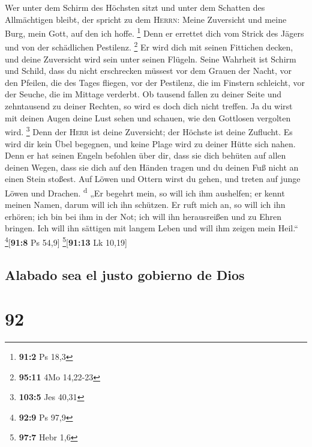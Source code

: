  Wer unter dem Schirm des Höchsten sitzt und unter dem
Schatten des Allmächtigen bleibt,  der spricht zu dem
\textsc{Herrn}: Meine Zuversicht und meine Burg, mein Gott, auf den ich
hoffe. \footnote{\textbf{91:2} Ps 18,3}  Denn er errettet
dich vom Strick des Jägers und von der schädlichen Pestilenz.
\footnote{\textbf{95:11} 4Mo 14,22-23}  Er wird dich mit
seinen Fittichen decken, und deine Zuversicht wird sein unter seinen
Flügeln. Seine Wahrheit ist Schirm und Schild,  dass du
nicht erschrecken müssest vor dem Grauen der Nacht, vor den Pfeilen, die
des Tages fliegen,  vor der Pestilenz, die im Finstern
schleicht, vor der Seuche, die im Mittage verderbt.  Ob
tausend fallen zu deiner Seite und zehntausend zu deiner Rechten, so
wird es doch dich nicht treffen.  Ja du wirst mit deinen
Augen deine Lust sehen und schauen, wie den Gottlosen vergolten wird.
\footnote{\textbf{103:5} Jes 40,31}  Denn der
\textsc{Herr} ist deine Zuversicht; der Höchste ist deine Zuflucht.
 Es wird dir kein Übel begegnen, und keine Plage wird zu
deiner Hütte sich nahen.  Denn er hat seinen Engeln
befohlen über dir, dass sie dich behüten auf allen deinen Wegen,
 dass sie dich auf den Händen tragen und du deinen Fuß
nicht an einen Stein stoßest.  Auf Löwen und Ottern wirst
du gehen, und treten auf junge Löwen und Drachen. \textsuperscript{d}
 „Er begehrt mein, so will ich ihm aushelfen; er kennt
meinen Namen, darum will ich ihn schützen.  Er ruft mich
an, so will ich ihn erhören; ich bin bei ihm in der Not; ich will ihn
herausreißen und zu Ehren bringen.  Ich will ihn sättigen
mit langem Leben und will ihm zeigen mein Heil.``
\footnote{\textbf{92:9} Ps 97,9}{[}\textbf{91:8} Ps 54,9{]}
\footnote{\textbf{97:7} Hebr 1,6}{[}\textbf{91:13} Lk 10,19{]}

\hypertarget{alabado-sea-el-justo-gobierno-de-dios}{%
\subsection{Alabado sea el justo gobierno de
Dios}\label{alabado-sea-el-justo-gobierno-de-dios}}

\hypertarget{section-91}{%
\section{92}\label{section-91}}

